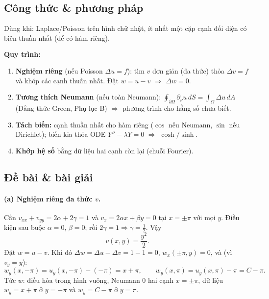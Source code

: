 \subsection*{Công thức \& phương pháp}

\begin{dieukienbox}
Dùng khi: Laplace/Poisson trên hình chữ nhật, ít nhất một cặp cạnh đối diện có biên thuần nhất (để có hàm riêng).
\end{dieukienbox}

\begin{nhobox}
\textbf{Quy trình:}
\begin{enumerate}
\item \textbf{Nghiệm riêng} (nếu Poisson $\Delta u=f$): tìm $v$ đơn giản (đa thức) thỏa $\Delta v=f$ và khớp các cạnh thuần nhất. Đặt $w=u-v$ $\Rightarrow$ $\Delta w=0$.
\item \textbf{Tương thích Neumann} (nếu toàn Neumann): $\displaystyle\oint_{\partial\Omega}\partial_\nu u\,dS=\int_\Omega \Delta u\,dA$ (Đẳng thức Green, Phụ lục B) $\Rightarrow$ phương trình cho hằng số chưa biết.
\item \textbf{Tách biến:} cạnh thuần nhất cho hàm riêng ($\cos$ nếu Neumann, $\sin$ nếu Dirichlet); biến kia thỏa ODE $Y''-\lambda Y=0$ $\Rightarrow$ $\cosh/\sinh$.
\item \textbf{Khớp hệ số} bằng dữ liệu hai cạnh còn lại (chuỗi Fourier).
\end{enumerate}
\end{nhobox}

\subsection*{Đề bài \& bài giải}

\paragraph{(a) Nghiệm riêng đa thức $v$.}\leavevmode

Cần $v_{xx}+v_{yy}=2\alpha+2\gamma=1$ và $v_x=2\alpha x+\beta y=0$ tại $x=\pm\pi$ với mọi $y$. Điều kiện sau buộc $\alpha=0$, $\beta=0$; rồi $2\gamma=1\Rightarrow\gamma=\tfrac12$. Vậy
\[
  v(x,y)=\frac{y^2}{2}.
\]
Đặt $w=u-v$. Khi đó $\Delta w=\Delta u-\Delta v=1-1=0$, $w_x(\pm\pi,y)=0$, và (vì $v_y=y$):
\[
  w_y(x,-\pi)=u_y(x,-\pi)-(-\pi)=x+\pi,\qquad w_y(x,\pi)=u_y(x,\pi)-\pi=C-\pi.
\]
Tức $w$: điều hòa trong hình vuông, Neumann $0$ hai cạnh $x=\pm\pi$, dữ liệu $w_y=x+\pi$ ở $y=-\pi$ và $w_y=C-\pi$ ở $y=\pi$.

